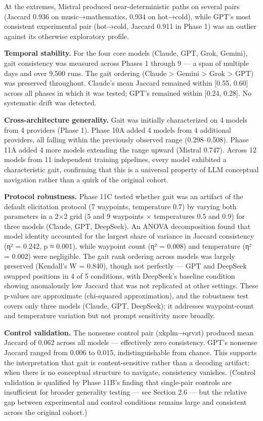 At the extremes, Mistral produced near-deterministic paths on several pairs (Jaccard 0.936 on music→mathematics, 0.934 on hot→cold), while GPT's most consistent experimental pair (hot→cold, Jaccard 0.911 in Phase 1) was an outlier against its otherwise exploratory profile.

\textbf{Temporal stability.} For the four core models (Claude, GPT, Grok, Gemini), gait consistency was measured across Phases 1 through 9 --- a span of multiple days and over 9,500 runs. The gait ordering (Claude \textgreater{} Gemini \textgreater{} Grok \textgreater{} GPT) was preserved throughout. Claude's mean Jaccard remained within {[}0.55, 0.60{]} across all phases in which it was tested; GPT's remained within {[}0.24, 0.28{]}. No systematic drift was detected.

\textbf{Cross-architecture generality.} Gait was initially characterized on 4 models from 4 providers (Phase 1). Phase 10A added 4 models from 4 additional providers, all falling within the previously observed range (0.298--0.508). Phase 11A added 4 more models extending the range upward (Mistral 0.747). Across 12 models from 11 independent training pipelines, every model exhibited a characteristic gait, confirming that this is a universal property of LLM conceptual navigation rather than a quirk of the original cohort.

\textbf{Protocol robustness.} Phase 11C tested whether gait was an artifact of the default elicitation protocol (7 waypoints, temperature 0.7) by varying both parameters in a 2×2 grid (5 and 9 waypoints × temperatures 0.5 and 0.9) for three models (Claude, GPT, DeepSeek). An ANOVA decomposition found that model identity accounted for the largest share of variance in Jaccard consistency (η² = 0.242, p ≈ 0.001), while waypoint count (η² = 0.008) and temperature (η² = 0.002) were negligible. The gait rank ordering across models was largely preserved (Kendall's W = 0.840), though not perfectly --- GPT and DeepSeek swapped positions in 4 of 5 conditions, with DeepSeek's baseline condition showing anomalously low Jaccard that was not replicated at other settings. These p-values are approximate (chi-squared approximation), and the robustness test covers only three models (Claude, GPT, DeepSeek); it addresses waypoint-count and temperature variation but not prompt sensitivity more broadly.

\textbf{Control validation.} The nonsense control pair (xkplm→qrvzt) produced mean Jaccard of 0.062 across all models --- effectively zero consistency. GPT's nonsense Jaccard ranged from 0.006 to 0.015, indistinguishable from chance. This supports the interpretation that gait is content-sensitive rather than a decoding artifact: when there is no conceptual structure to navigate, consistency vanishes. (Control validation is qualified by Phase 11B's finding that single-pair controls are insufficient for broader generality testing --- see Section 2.6 --- but the relative gap between experimental and control conditions remains large and consistent across the original cohort.)


